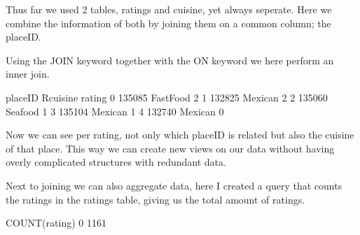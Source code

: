 \documentclass[letterpaper,10pt,english]{jupyterBook}
\begin{document}
\sphinxAtStartPar
Thus far we used 2 tables, ratings and cuisine, yet always seperate.
Here we combine the information of both by joining them on a common column; the placeID.

\sphinxAtStartPar
Using the JOIN keyword together with the ON keyword we here perform an inner join.

\begin{sphinxVerbatim}[commandchars=\\\{\}]
  
\end{sphinxVerbatim}

\begin{sphinxVerbatim}[commandchars=\\\{\}]
   placeID   Rcuisine  rating
0   135085  Fast\PYGZus{}Food       2
1   132825    Mexican       2
2   135060    Seafood       1
3   135104    Mexican       1
4   132740    Mexican       0
\end{sphinxVerbatim}

\sphinxAtStartPar
Now we can see per rating, not only which placeID is related but also the cuisine of that place.
This way we can create new views on our data without having overly complicated structures with redundant data.

\sphinxAtStartPar
Next to joining we can also aggregate data, here I created a query that counts the ratings in the ratings table, giving us the total amount of ratings.

\begin{sphinxVerbatim}[commandchars=\\\{\}]
  
\end{sphinxVerbatim}

\begin{sphinxVerbatim}[commandchars=\\\{\}]
   COUNT(rating)
0           1161
\end{sphinxVerbatim}
\end{document}
